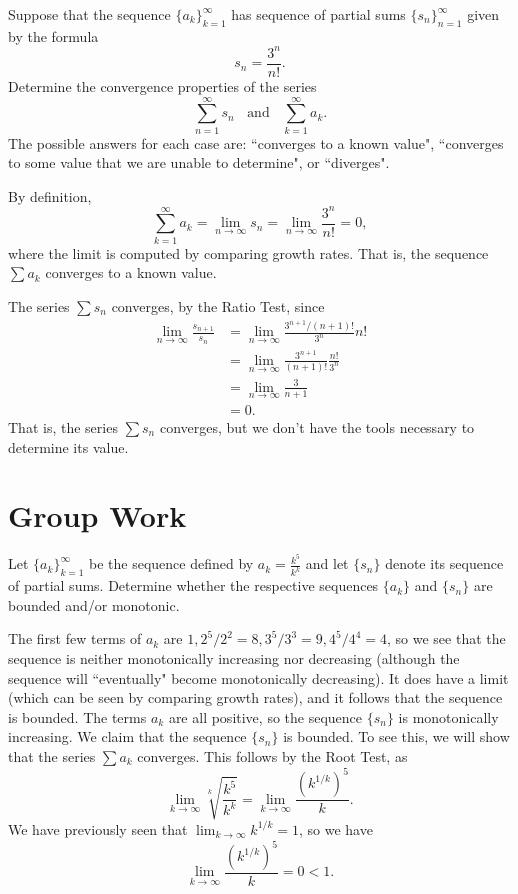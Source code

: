 \documentclass[]{ximera}
\begin{document}
\begin{problem}
Suppose that the sequence $\{a_k\}_{k=1}^\infty$ has sequence of partial sums $\{s_n\}_{n=1}^\infty$ given by the formula
$$
s_n = \frac{3^n}{n!}.
$$
Determine the convergence properties of the series 
$$
\sum_{n=1}^\infty s_n \;\; \mbox{ and } \;\; \sum_{k=1}^\infty a_k. 
$$
The possible answers for each case are: ``converges to a known value", ``converges to some value that we are unable to determine", or ``diverges".

\begin{freeResponse}
By definition,
$$
\sum_{k=1}^\infty a_k = \lim_{n\rightarrow \infty} s_n = \lim_{n\rightarrow \infty} \frac{3^n}{n!} = 0,
$$
where the limit is computed by comparing growth rates. That is, the sequence $\sum a_k$ converges to a known value.

The series $\sum s_n$ converges, by the Ratio Test, since
\begin{align*}
\lim_{n \rightarrow \infty} \frac{s_{n+1}}{s_n} &= \lim_{n \rightarrow \infty} \frac{3^{n+1}/(n+1)!}{3^n}{n!} \\
&= \lim_{n \rightarrow \infty} \frac{3^{n+1}}{(n+1)!} \frac{n!}{3^n} \\
&= \lim_{n \rightarrow \infty} \frac{3}{n+1} \\
&= 0.
\end{align*}
That is, the series $\sum s_n$ converges, but we don't have the tools necessary to determine its value. 
\end{freeResponse}
\end{problem}

\section{Group Work}

\begin{problem}
Let $\{a_k\}_{k=1}^\infty$ be the sequence defined by $a_k = \frac{k^5}{k^k}$ and let $\{s_n\}$ denote its sequence of partial sums. Determine whether the respective sequences $\{a_k\}$ and $\{s_n\}$ are bounded and/or monotonic.

\begin{freeResponse}
The first few terms of $a_k$ are $1, 2^5/2^2 = 8, 3^5/3^3 = 9, 4^5/4^4 = 4$, so we see that the sequence is neither monotonically increasing nor decreasing (although the sequence will ``eventually" become monotonically decreasing). It does have a limit (which can be seen by comparing growth rates), and it follows that the sequence is bounded. The terms $a_k$ are all positive, so the sequence $\{s_n\}$ is monotonically increasing. We claim that the sequence $\{s_n\}$ is bounded. To see this, we will show that the series $\sum a_k$ converges. This follows by the Root Test, as 
$$
\lim_{k\rightarrow \infty} \sqrt[k]{\frac{k^5}{k^k}} = \lim_{k\rightarrow \infty} \frac{(k^{1/k})^5}{k}.
$$
We have previously seen that $\lim_{k\rightarrow \infty} k^{1/k} = 1$, so we have 
$$
\lim_{k\rightarrow \infty} \frac{(k^{1/k})^5}{k} = 0 < 1.
$$
\end{freeResponse}
\end{problem}
\end{document}
